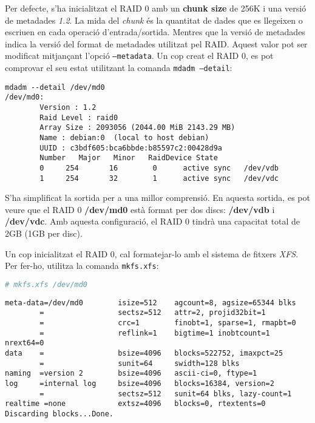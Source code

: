 Per defecte, s'ha inicialitzat el RAID 0 amb un \textbf{chunk size} de 256K i una versió de metadades  \emph{1.2}. La mida del \textit{chunk} és la quantitat de dades que es llegeixen o escriuen en cada operació d'entrada/sortida. Mentres que la versió de metadades indica la versió del format de metadades utilitzat pel RAID. Aquest valor pot ser modificat mitjançant l'opció \texttt{--metadata}. Un cop creat el RAID 0, es pot comprovar el seu estat utilitzant la comanda \texttt{mdadm --detail}:

\begin{terminaloutput}
\footnotesize\begin{verbatim}
mdadm --detail /dev/md0
/dev/md0:
        Version : 1.2
        Raid Level : raid0
        Array Size : 2093056 (2044.00 MiB 2143.29 MB)
        Name : debian:0  (local to host debian)
        UUID : c3bdf605:bca6bbde:b85597c2:00428d9a
        Number   Major   Minor   RaidDevice State
        0     254       16        0      active sync   /dev/vdb
        1     254       32        1      active sync   /dev/vdc
\end{verbatim}
\end{terminaloutput}

S'ha simplificat la sortida per a una millor comprensió. En aquesta sortida, es pot veure que el RAID 0 \textbf{/dev/md0} està format per dos discs: \textbf{/dev/vdb} i \textbf{/dev/vdc}. Amb aquesta configuració, el RAID 0 tindrà una capacitat total de 2GB (1GB per disc).

Un cop inicialitzat el RAID 0, cal formatejar-lo amb el sistema de fitxers \emph{XFS}. Per fer-ho, utilitza la comanda \texttt{mkfs.xfs}:

\begin{lstlisting}[language=bash, numbers=none, commentstyle=\color{black}]
# mkfs.xfs /dev/md0
\end{lstlisting}

\begin{terminaloutput}
\footnotesize\begin{verbatim}
meta-data=/dev/md0        isize=512    agcount=8, agsize=65344 blks
        =                 sectsz=512   attr=2, projid32bit=1
        =                 crc=1        finobt=1, sparse=1, rmapbt=0
        =                 reflink=1    bigtime=1 inobtcount=1 nrext64=0
data    =                 bsize=4096   blocks=522752, imaxpct=25
        =                 sunit=64     swidth=128 blks
naming  =version 2        bsize=4096   ascii-ci=0, ftype=1
log     =internal log     bsize=4096   blocks=16384, version=2
        =                 sectsz=512   sunit=64 blks, lazy-count=1
realtime =none            extsz=4096   blocks=0, rtextents=0
Discarding blocks...Done.

\end{verbatim}
\end{terminaloutput}

